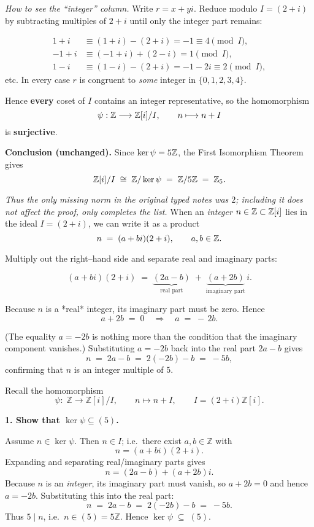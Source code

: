 \documentclass[12pt]{article}
\theoremstyle{definition} %
\theoremstyle{plain} %
\begin{document}
\emph{How to see the “integer” column.}
Write $r=x+yi$.  Reduce modulo $I=(2+i)$ by subtracting
multiples of $2+i$ until only the integer part remains:

\[
\begin{aligned}
1+i &\equiv (1+i)-(2+i)=-1\equiv 4\pmod{I},\\
-1+i&\equiv(-1+i)+(2-i)=1\pmod{I},\\
1-i &\equiv(1-i)-(2+i)=-1-2i\equiv2\pmod{I},
\end{aligned}
\]
etc.  In every case $r$ is congruent to \emph{some} integer
in $\{0,1,2,3,4\}$.

Hence \textbf{every} coset of $I$ contains an integer
representative, so the homomorphism
\[
\psi:\Bbb Z\longrightarrow\Bbb Z[i]/I,\qquad n\longmapsto n+I
\]
is \textbf{surjective}.

\bigskip
\textbf{Conclusion (unchanged).}
Since $\ker\psi=5\Bbb Z$, the First Isomorphism Theorem gives
\[
\Bbb Z[i]/I\;\cong\;\Bbb Z/\ker\psi
          \;=\;\Bbb Z/5\Bbb Z
          \;=\;\Bbb Z_{5}.
\]

\medskip
\emph{Thus the only missing norm in the original typed notes was $2$;
including it does not affect the proof, only completes the list.}
When an \emph{integer} \(n\in\Bbb Z\subset\Bbb Z[i]\) lies in the ideal
\(I=(2+i)\), we can write it as a product
\[
n \;=\;(a+bi)(2+i), \qquad a,b\in\Bbb Z.
\]

Multiply out the right–hand side and separate real and imaginary parts:

\[
(a+bi)(2+i)
\;=\;\underbrace{(2a-b)}_{\text{real part}}
\;+\;
\underbrace{(a+2b)}_{\text{imaginary part}}\,i.
\]

Because \(n\) is a *real* integer, its imaginary part must be zero.  
Hence
\[
a+2b \;=\;0 
\quad\Longrightarrow\quad
a \;=\;-\,2b.
\]

(The equality \(a=-2b\) is nothing more than the condition that the
imaginary component vanishes.)
Substituting \(a=-2b\) back into the real part \(2a-b\) gives
\[
n \;=\;2a-b \;=\;2(-2b)-b \;=\;-5b,
\]
confirming that \(n\) is an integer multiple of \(5\).

Recall the homomorphism
\[
\psi:\;\mathbb Z \longrightarrow \mathbb Z[i]/I, 
\qquad n \longmapsto n+I,
\qquad I=(2+i)\mathbb Z[i].
\]

\bigskip
\textbf{1.  Show that \(\ker\psi \subseteq (5)\).}

Assume \(n\in\ker\psi\).
Then \(n\in I\); i.e.\ there exist \(a,b\in\mathbb Z\) with
\[
n=(a+bi)(2+i).
\]
Expanding and separating real/imaginary parts gives
\[
n=(2a-b) +(a+2b)i.
\]
Because \(n\) is an \emph{integer}, its imaginary part must vanish, so
\(a+2b=0\) and hence \(a=-2b\).
Substituting this into the real part:
\[
n \;=\; 2a-b \;=\; 2(-2b)-b \;=\; -5b.
\]
Thus \(5\mid n\), i.e.\ \(n\in(5)=5\mathbb Z\).  
Hence \(\boxed{\ker\psi\;\subseteq\;(5)}\).
\end{document}
